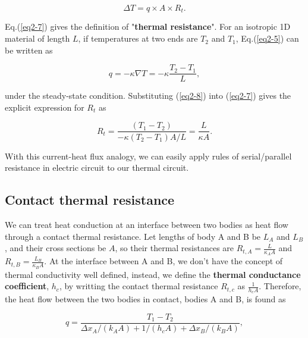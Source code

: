\begin{equation}
    \Delta T = q\times A\times R_t.
    \label{eq2-7}
\end{equation}

Eq.(\ref{eq2-7}) gives the definition of "\textbf{thermal resistance}". For an isotropic 1D material of length $L$, if temperatures at two ends are \begin{math}T_2\end{math} and \begin{math}T_{1}\end{math}, Eq.(\ref{eq2-5}) can be written as

\begin{equation}
    q=-\kappa\nabla T=-\kappa\frac{T_2-T_1}{L},
    \label{eq2-8}
\end{equation}

under the steady-state condition. Substituting (\ref{eq2-8}) into (\ref{eq2-7}) gives the explicit expression for $R_t$ as

\begin{equation}
    R_t=\frac{(T_{1}-T_{2})}{-\kappa(T_2-T_1)A/L}=\frac{L}{\kappa A}.
    \label{eq2-9}
\end{equation}

With this current-heat flux analogy, we can easily apply rules of serial/parallel resistance in electric circuit to our thermal circuit. 

\subsection{Contact thermal resistance}

We can treat heat conduction at an interface between two bodies as heat flow through a contact thermal resistance. Let lengths of body A and B be $L_A$ and $L_B$, and their cross sections be $A$, so their thermal resistances are $R_{t,A}=\frac{L}{\kappa_AA}$ and $R_{t,B}=\frac{L_B}{\kappa_BA}$. At the interface between A and B, we don't have the concept of thermal conductivity well defined, instead, we define the \textbf{thermal conductance coefficient}, $h_c$, by writting the contact thermal resistance $R_{t,c}$ as $\frac{1}{h_cA}$. Therefore, the heat flow between the two bodies in contact, bodies A and B, is found as

\begin{equation}
    q=\frac{T_{1}-T_{2}}{\Delta x_{A} /\left(k_{A} A\right)+1 /\left(h_{c} A\right)+\Delta x_{B} /\left(k_{B} A\right)},
    \label{eq2-10}
\end{equation}

